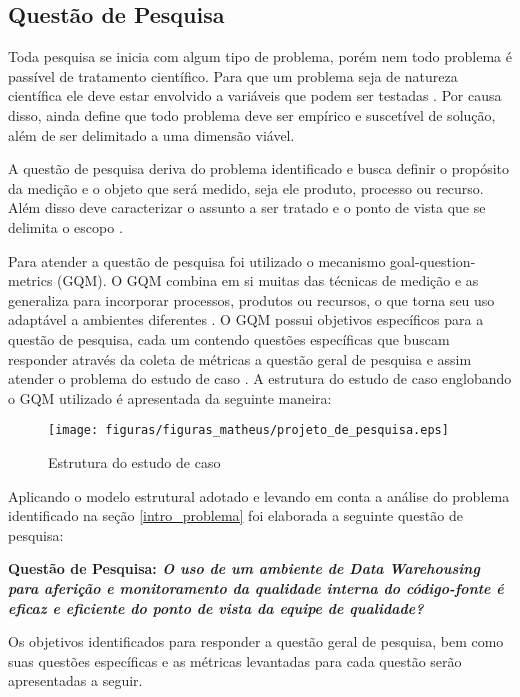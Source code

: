 \subsection{Questão de Pesquisa}

Toda pesquisa se inicia com algum tipo de problema, porém nem todo problema é passível de tratamento científico. Para que um problema seja de natureza científica ele deve estar envolvido a variáveis que podem ser testadas \cite{gil_como_2002}. Por causa disso,  ainda define que todo problema deve ser empírico e suscetível de solução, além de ser delimitado a uma dimensão viável.

A questão de pesquisa deriva do problema identificado e busca definir o propósito da medição e o objeto que será medido, seja ele produto, processo ou recurso. Além disso deve caracterizar o assunto a ser tratado e o ponto de vista que se delimita o escopo \cite{Basili96b} \cite{caldiera_goal_1994}.

Para atender a questão de pesquisa foi utilizado o mecanismo goal-question-metrics (GQM). O GQM combina em si muitas das técnicas de medição e as generaliza para incorporar processos, produtos ou recursos, o que torna seu uso adaptável a ambientes diferentes \cite{caldiera_goal_1994}. O GQM possui objetivos específicos para a questão de pesquisa, cada um contendo questões específicas que buscam responder através da coleta de métricas a questão geral de pesquisa e assim atender o problema do estudo de caso \cite{Basili96b}. A estrutura do estudo de caso englobando o GQM utilizado é apresentada da seguinte maneira:  

\begin{figure}[h!]
\centering
\texttt{[image: figuras/figuras\_matheus/projeto\_de\_pesquisa.eps]}
\caption{Estrutura do estudo de caso}
\label{fig:pesquisa}
\end{figure}
\FloatBarrier

Aplicando o modelo estrutural adotado e levando em conta a análise do problema identificado na seção \ref{intro_problema} foi elaborada a seguinte questão de pesquisa:

\textbf{Questão de Pesquisa: \textit{O uso de um ambiente de Data Warehousing para aferição e monitoramento da qualidade interna do código-fonte é eficaz e eficiente do ponto de vista da equipe de qualidade?}}

Os objetivos identificados para responder a questão geral de pesquisa, bem como suas questões específicas e as métricas levantadas para cada questão serão apresentadas a seguir.

